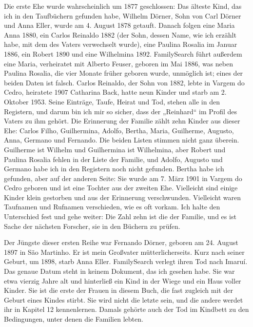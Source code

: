 \documentclass[
  ngerman,
  11pt,
  openany]{book}
\begin{document}
Die erste Ehe wurde wahrscheinlich um 1877 geschlossen: Das älteste
Kind, das ich in den Taufbüchern gefunden habe, Wilhelm Dörner, Sohn von
Carl Dörner und Anna Eller, wurde am 4. August 1878 getauft. Danach
folgen eine Maria Anna 1880, ein Carlos Reinaldo 1882 (der Sohn, dessen
Name, wie ich erzählt habe, mit dem des Vaters verwechselt wurde), eine
Paulina Rosalia im Januar 1886, ein Robert 1890 und eine Wilhelmina
1892. FamilySearch führt außerdem eine Maria, verheiratet mit Alberto
Feuser, geboren im Mai 1886, was neben Paulina Rosalia, die vier Monate
früher geboren wurde, unmöglich ist; eines der beiden Daten ist falsch.
Carlos Reinaldo, der Sohn von 1882, lebte in Vargem do Cedro, heiratete
1907 Catharina Back, hatte neun Kinder und starb am 2. Oktober 1953.
Seine Einträge, Taufe, Heirat und Tod, stehen alle in den Registern, und
darum bin ich mir so sicher, dass der „Reinhard`` im Profil des Vaters
zu ihm gehört. Die Erinnerung der Familie zählt zehn Kinder aus dieser
Ehe: Carlos Filho, Guilhermina, Adolfo, Bertha, Maria, Guilherme,
Augusto, Anna, Germano und Fernando. Die beiden Listen stimmen nicht
ganz überein. Guilherme ist Wilhelm und Guilhermina ist Wilhelmina, aber
Robert und Paulina Rosalia fehlen in der Liste der Familie, und Adolfo,
Augusto und Germano habe ich in den Registern noch nicht gefunden.
Bertha habe ich gefunden, aber auf der anderen Seite: Sie wurde am 7.
März 1901 in Vargem do Cedro geboren und ist eine Tochter aus der
zweiten Ehe. Vielleicht sind einige Kinder klein gestorben und aus der
Erinnerung verschwunden. Vielleicht waren Taufnamen und Rufnamen
verschieden, wie es oft vorkam. Ich halte den Unterschied fest und gehe
weiter: Die Zahl zehn ist die der Familie, und es ist Sache der nächsten
Forscher, sie in den Büchern zu prüfen.

Der Jüngste dieser ersten Reihe war Fernando Dörner, geboren am 24.
August 1897 in São Martinho. Er ist mein Großvater mütterlicherseits.
Kurz nach seiner Geburt, um 1898, starb Anna Eller. FamilySearch verlegt
ihren Tod nach Imaruí. Das genaue Datum steht in keinem Dokument, das
ich gesehen habe. Sie war etwa vierzig Jahre alt und hinterließ ein Kind
in der Wiege und ein Haus voller Kinder. Sie ist die erste der Frauen in
diesem Buch, die fast zugleich mit der Geburt eines Kindes stirbt. Sie
wird nicht die letzte sein, und die andere werdet ihr in Kapitel 12
kennenlernen. Damals gehörte auch der Tod im Kindbett zu den
Bedingungen, unter denen die Familien lebten.
\end{document}

